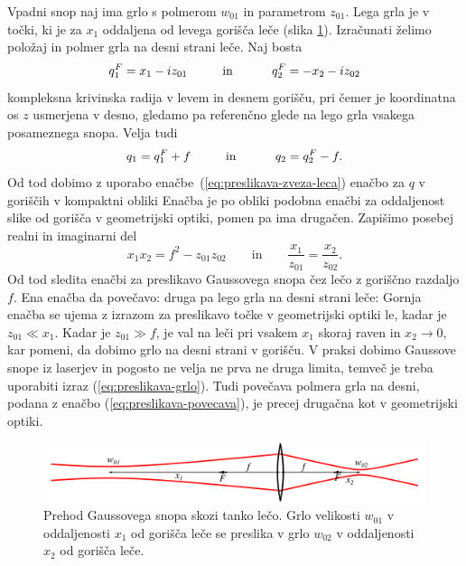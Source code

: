 Vpadni snop naj ima grlo s polmerom $w_{01}$ in parametrom $z_{01}$. Lega grla je 
v točki, ki je za $x_{1}$ oddaljena od levega gorišča leče (slika
\ref{fig:Prehod-Gaussovega-snopa}). Izračunati želimo položaj in
polmer grla na desni strani leče. Naj bosta 
\begin{equation}
q_{1}^{F}=x_{1}-iz_{01}\mbox{\hskip1cm in \hskip1cm}q_{2}^{F}=-x_{2}-iz_{02}
\end{equation}
 kompleksna krivinska radija v levem in desnem gorišču, pri čemer je koordinatna os $z$ 
 usmerjena v desno, gledamo pa referenčno glede na lego grla vsakega posameznega snopa. Velja tudi
\begin{equation}
q_{1}=q_{1}^{F}+f\mbox{\hskip1cm in \hskip1cm}q_{2}=q_{2}^{F}-f.
\end{equation}
 Od tod dobimo z uporabo enačbe~(\ref{eq:preslikava-zveza-leca}) enačbo
za $q$ v goriščih v kompaktni obliki 
 Enačba je po obliki podobna enačbi za oddaljenost slike od gorišča v
geometrijski optiki, pomen pa ima drugačen. Zapišimo posebej realni
in imaginarni del 
\begin{equation}
x_{1}x_{2}=f^{2}-z_{01}z_{02} \qquad \mathrm{in} \qquad
\frac{x_{1}}{z_{01}}=\frac{x_{2}}{z_{02}}.
\end{equation}
Od tod sledita enačbi za preslikavo Gaussovega snopa čez lečo z goriščno razdaljo $f$.
Ena enačba da povečavo:
druga pa lego grla na desni strani leče: 
Gornja enačba se ujema z izrazom za preslikavo točke v geometrijski
optiki le, kadar je $z_{01}\ll x_{1}$. Kadar je $z_{01}\gg f$, je
val na leči pri vsakem $x_{1}$ skoraj raven in $x_2 \to 0$, kar pomeni, da dobimo 
grlo na desni strani v gorišču. V praksi dobimo Gaussove snope iz laserjev in pogosto ne
velja ne prva ne druga limita, temveč je treba uporabiti izraz (\ref{eq:preslikava-grlo}).
Tudi povečava polmera grla na desni, podana z enačbo (\ref{eq:preslikava-povecava}),
je precej drugačna kot v geometrijski optiki.\\

\begin{figure}
\includegraphics[width=15truecm]{slike/03_Prehod_Gaussovega_snopa.png}
\caption{Prehod Gaussovega snopa skozi
tanko lečo. Grlo velikosti $w_{01}$ v oddaljenosti $x_{1}$ od gorišča
leče se preslika v grlo $w_{02}$ v oddaljenosti $x_{2}$ od gorišča
leče.}
\label{fig:Prehod-Gaussovega-snopa}
\end{figure}


